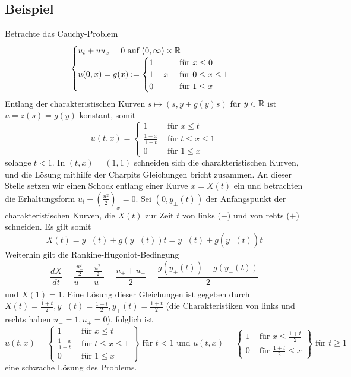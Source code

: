 \subsection{Beispiel}
\label{bsp_18}
	Betrachte das Cauchy-Problem \marginnote{[18]}
	\[ \begin{cases}
		u_t+uu_x = 0 \text{ auf } (0,\infty) \times \mathbb{R} \\
		u(0,x) = g(x) := \begin{cases}
			1	& \text{ für } x \leq 0 \\
			1-x & \text{ für } 0 \leq x \leq 1 \\
			0	& \text{ für } 1 \leq x \end{cases} \end{cases} \]
	Entlang der charakteristischen Kurven $s \mapsto (s,y+g(y)s)$ für $y \in \mathbb{R}$ ist $u = z(s) = g(y)$ konstant, somit
	\[ u(t,x) = \begin{cases}
		1	&	\text{ für } x \leq t \\
		\frac{1-x}{1-t} & \text{ für } t \leq x \leq 1 \\
		0	&	\text{ für } 1 \leq x \end{cases} \]
	solange $t < 1$. In $(t,x) = (1,1)$ schneiden sich die charakteristischen Kurven, und die Lösung mithilfe der Charpits Gleichungen bricht zusammen. An dieser Stelle setzen wir einen Schock entlang einer Kurve $x = X(t)$ ein und betrachten die Erhaltungsform $u_t + \left( \frac{u^2}{2} \right)_x = 0$. Sei $(0,y_\pm(t))$ der Anfangspunkt der charakteristischen Kurven, die $X(t)$ zur Zeit $t$ von links ($-$) und von rehts ($+$) schneiden. Es gilt somit
	\[ X(t) = y_-(t) + g(y_-(t))t = y_+(t) + g(y_+(t))t \]
	Weiterhin gilt die Rankine-Hugoniot-Bedingung
	\[ \frac{dX}{dt} = \frac{\frac{u_+^2}{2}-\frac{u_-^2}{2}}{u_+ - u_-} = \frac{u_+ + u_-}{2} = \frac{g(y_+(t)) + g(y_-(t))}{2} \]
	und $X(1)=1$. Eine Lösung dieser Gleichungen ist gegeben durch $X(t) = \frac{1+t}{2}, y_-(t) = \frac{1-t}{2}, y_+(t) = \frac{1+t}{2}$ (die Charakteristiken von links und rechts haben $u_-=1, u_+ = 0$), folglich ist
	\[ u(t,x) = \left. \begin{cases}
		1	&	\text{ für } x \leq t \\
		\frac{1-x}{1-t}	&	\text{ für } t \leq x \leq 1 \\
		0	&	\text{ für } 1 \leq x \end{cases} \right\} \text{ für } t<1 \text{ und } u(t,x) = \left. \begin{cases}
		1	&	\text{ für } x \leq \frac{1+t}{2} \\
		0	&	\text{ für } \frac{1+t}{2} \leq x \end{cases} \right\} \text{ für } t \geq 1 \]
	eine schwache Lösung des Problems.
	
